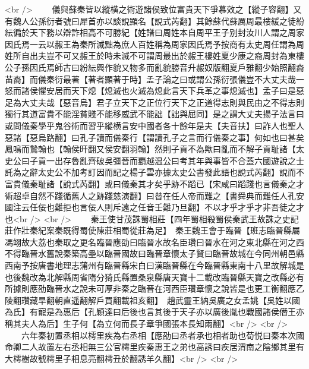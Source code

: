 <br />
　　儀與蘇秦皆以縱横之術遊諸侯致位富貴天下爭慕效之【縱子容翻】又有魏人公孫衍者號曰犀首亦以談說顯名【說式芮翻】其餘蘇代蘇厲周最樓緩之徒紛紜徧於天下務以辯詐相高不可勝紀【姓譜曰周姓本自周平王子别封汝川人謂之周家因氏焉一云以赧王為秦所滅黜為庶人百姓稱為周家因氏焉予按商有太史周任謂為周姓所自出夫豈不可又赧王於時未滅不可謂周最出於赧王樓姓夏少康之裔周封為東樓公子孫因氏焉師古曰紛紜興作貌又物多而亂貌勝音升赧奴版翻夏戶雅翻少始照翻裔苖裔】而儀秦衍最著【著者顯著于時】孟子論之曰或謂公孫衍張儀豈不大丈夫哉一怒而諸侯懼安居而天下熄【熄滅也火滅為熄此言天下兵革之事熄滅也】孟子曰是惡足為大丈夫哉【惡音烏】君子立天下之正位行天下之正道得志則與民由之不得志則獨行其道富貴不能淫貧賤不能移威武不能詘【詘與屈同】是之謂大丈夫揚子法言曰或問儀秦學乎鬼谷術而習乎縱横言安中國者各十餘年是夫【夫音扶】曰詐人也聖人惡諸【惡烏路翻】曰孔子讀而儀秦行【謂讀孔子之言而行儀秦之事】何如也曰甚矣鳳鳴而鷙翰也【翰侯旰翻又侯安翻羽翰】然則子貢不為歟曰亂而不解子貢耻諸【太史公曰子貢一出存魯亂齊破吳彊晉而覇越温公曰考其年與事皆不合蓋六國遊說之士託為之辭太史公不加考訂因而記之楊子雲亦據太史公書發此語也說式芮翻】說而不富貴儀秦耻諸【說式芮翻】或曰儀秦其才矣乎跡不蹈已【宋咸曰蹈踐也言儀秦之才術超卓自然不踐循舊人之跡踐慈演翻】曰㫺在任人帝而難之【書舜典而難任人孔安國注云任佞也難拒也言佞人則斥遠之任音壬難乃旦翻】不以才乎才乎才非吾徒之才也<br />
<br />
　　秦王使甘茂誅蜀相莊【四年蜀相殺蜀侯秦武王故誅之史記莊作壯秦紀案秦既得蜀使陳莊相蜀從莊為足】　秦王魏王會于臨晉【班志臨晉縣屬馮翊故大荔也秦取之更名臨晉應劭曰臨晉水故名臣瓚曰晉水在河之東北縣在河之西不得臨晉水舊說秦築高壘以臨晉國故曰臨晉章懷太子賢曰臨晉故城在今同州朝邑縣西南予按唐書地理志蒲州有臨晉縣宋白曰漢臨晉縣在今臨晉縣東南十八里故解城是也後魏改為北解縣周省隋分猗氏縣置桑泉縣唐天寶十二載改臨晉縣天寶之改縣必有所據則應劭臨晉水之說未可厚非秦之臨晉在河西臣瓚章懷之說皆是也更工衡翻應乙陵翻瓚藏旱翻朝直遥翻解戶買翻載祖亥翻】　趙武靈王納吳廣之女孟姚【吳姓以國為氏】有寵是為惠后【孔穎達曰后後也言其後于天子亦以廣後胤也戰國諸侯僭王亦稱其夫人為后】生子何【為立何而長子章爭國張本長知兩翻】<br />
<br />
　　六年秦初置丞相以樗里疾為右丞相【應劭曰丞者承也相者助也荀悦曰秦本次國命卿二人故置左右丞相無三公官樗里疾秦惠王之弟也高誘曰疾居渭南之陰鄉其里有大樗樹故號樗里子相息亮翻樗丑於翻誘羊久翻】<br />
<br />
